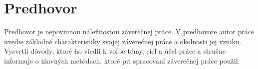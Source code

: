 \chapter*{Predhovor}
\thispagestyle{empty}

Predhovor je nepovinnou náležitosťou záverečnej práce. V predhovore autor práce uvedie základné charakteristiky svojej záverečnej práce a okolnosti jej vzniku. Vysvetlí dôvody, ktoré ho viedli k voľbe témy, cieľ a účel práce a stručne informuje o hlavných metódach, ktoré pri spracovaní záverečnej práce  použil.

\cleardoublepage

